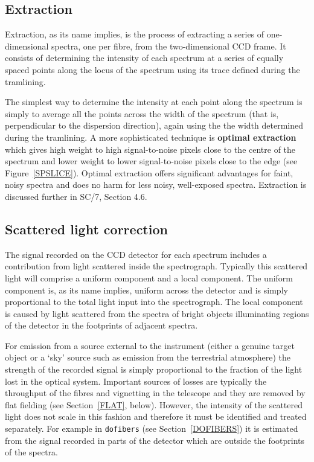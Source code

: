 \documentclass[twoside,11pt]{article}
\newcommand{\xref}[3]{#1}
\begin{document}
\subsection{Extraction}

Extraction, as its name implies, is the process of extracting a series
of one-dimensional spectra, one per fibre, from the two-dimensional
CCD frame.  It consists of determining the intensity of each spectrum
at a series of equally spaced points along the locus of the spectrum
using its trace defined during the tramlining.

The simplest way to determine the intensity at each point along the
spectrum is simply to average all the points across the width of
the spectrum (that is, perpendicular to the dispersion direction),
again using the the width determined during the tramlining.  A more
sophisticated technique is {\bf optimal extraction} which gives high
weight to high signal-to-noise pixels close to the centre of the
spectrum and lower weight to lower signal-to-noise pixels close to the
edge (see Figure~\ref{SPSLICE}).  Optimal extraction offers significant
advantages for faint, noisy spectra and does no harm for less noisy,
well-exposed spectra.  Extraction is discussed further in 
\xref{SC/7, Section 4.6}{sc7}{extraction}.

\subsection{\label{SCATTER}Scattered light correction}

The signal recorded on the CCD detector for each spectrum includes a
contribution from light scattered inside the spectrograph.  Typically
this scattered light will comprise a uniform component and a local
component.  The uniform component is, as its name implies, uniform across
the detector and is simply proportional to the total light input into the
spectrograph.  The local component is caused by light scattered from
the spectra of bright objects illuminating regions of the detector
in the footprints of adjacent spectra.

For emission from a source external to the instrument (either a
genuine target object or a `sky' source such as emission from the
terrestrial atmosphere) the strength of the recorded signal is simply
proportional to the fraction of the light lost in the optical system.
Important sources of losses are typically the throughput of the fibres
and vignetting in the telescope and they are removed by flat fielding
(see Section~\ref{FLAT}, below).  However, the intensity of the scattered
light does not scale in this fashion and therefore it must be identified
and treated separately.  For example in {\tt dofibers} (see
Section~\ref{DOFIBERS}) it is estimated from the signal recorded in parts
of the detector which are outside the footprints of the spectra.
\end{document}
